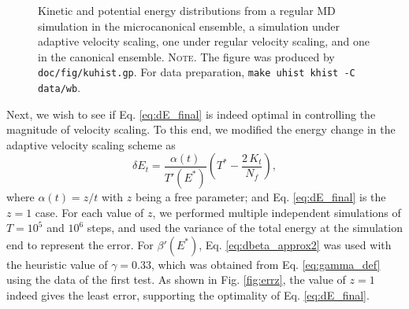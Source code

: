 \documentclass[reprint]{revtex4-1}
\newcommand{\note}[1]{{\color{DarkGreen}\footnotesize \textsc{Note.} #1}}
\begin{document}
\begin{figure}[h]
\begin{center}
  \caption{
    \label{fig:kuhist}
    Kinetic and potential energy distributions
    from a regular MD simulation in the microcanonical ensemble,
    a simulation under adaptive velocity scaling,
    one under regular velocity scaling,
    and one in the canonical ensemble.
    \note{The figure was produced by \texttt{doc/fig/kuhist.gp}.
      For data preparation, \texttt{make uhist khist -C data/wb}.
    }%
  }
\end{center}
\end{figure}


Next, we wish to see if Eq. \eqref{eq:dE_final}
is indeed optimal in controlling the magnitude of velocity scaling.
%
To this end, we modified the energy change in
the adaptive velocity scaling scheme as
%
\begin{equation}
  \delta E_t
  =
  \frac{ \alpha(t) } { T'(E^*) }
  \left(
   T^* -
   \frac{ 2 \, K_t } { N_f }
  \right)
  ,
  \label{eq:dE_mod}
\end{equation}
%
where $\alpha(t) = z/t$ with $z$ being a free parameter;
and Eq. \eqref{eq:dE_final} is the $z = 1$ case.
%
For each value of $z$,
we performed multiple independent simulations of
$T = 10^5$ and $10^6$ steps,
and used the variance of the total energy at the simulation end
to represent the error.
%
For $\beta'(E^*)$,
Eq. \eqref{eq:dbeta_approx2} was used with the heuristic value of
$\gamma = 0.33$,
which was obtained from Eq. \eqref{eq:gamma_def}
using the data of the first test.
%
As shown in Fig. \ref{fig:errz},
the value of $z = 1$
indeed gives the least error,
supporting the optimality of Eq. \eqref{eq:dE_final}.
\end{document}

